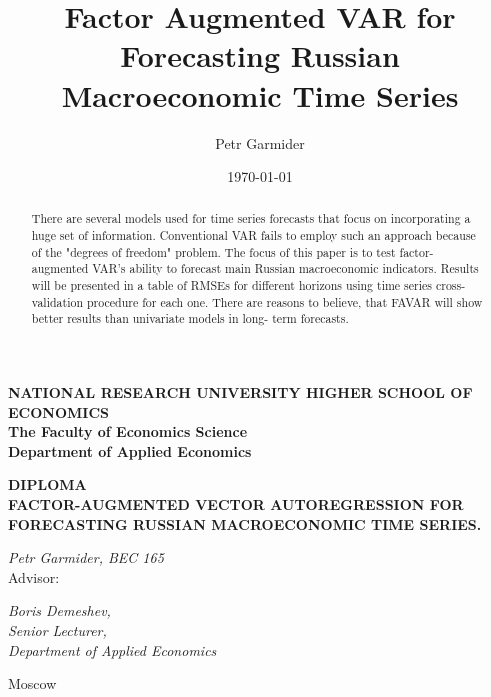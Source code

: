 \documentclass[a4paper, 14pt]{article}
\title{Factor Augmented VAR for Forecasting Russian Macroeconomic Time Series}
\author{Petr Garmider}
\date{\today}
\begin{document}
	\newpage
	\thispagestyle{empty}
	\begin{center}
		
		\vspace{0.1ex}
		
		{\textbf{NATIONAL RESEARCH UNIVERSITY HIGHER SCHOOL OF ECONOMICS}}\\
		\vspace{1ex}
		{\textbf{The Faculty of Economics Science}}\\
		\vspace{1ex}
		{\textbf{
				Department of Applied Economics}}\\
		
	\end{center}
	\vspace{5ex}
	\begin{center}
		\vspace{3ex}
		{\textbf{DIPLOMA}}\\
		\vspace{3ex}
		{
			\vspace{2ex} \textbf{FACTOR-AUGMENTED VECTOR AUTOREGRESSION FOR FORECASTING RUSSIAN MACROECONOMIC TIME SERIES.}}
	\end{center}
	\begin{flushright}
		\vspace{5ex}
		\noindent
		\textit{Petr Garmider, BEC 165}
		\\
		\vspace{5ex}
		Advisor:\\
		\vspace{2ex}
		
		\textit{Boris Demeshev, \\Senior Lecturer, \\Department of Applied Economics}\\
		
		
	\end{flushright}

	\vspace{18ex}
	
	\begin{center}
		\vspace{3ex}
		{Moscow}\\
		\vspace{1ex}{17 April 2020}
	\end{center}	
	
	\newpage
	
\begin{abstract}
	There are several models used for time series forecasts that focus on incorporating a huge set of information. Conventional VAR fails to employ such an approach because of the "degrees of freedom" problem. The focus of this paper is to test factor-augmented VAR's ability to forecast main Russian macroeconomic indicators. Results will be presented in a table of RMSEs for different horizons using time series cross-validation procedure for each one. There are reasons to believe, that FAVAR will show better results than univariate models in long- term forecasts.
	 
\end{abstract}
\end{document}
